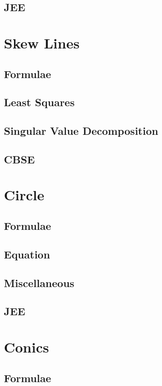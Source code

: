 \documentclass[journal]{IEEEtran}
\begin{document}
	\subsection{JEE}
	
	\newpage
	\section{Skew Lines}
	\subsection{Formulae}
	
	\subsection{Least Squares}
	
	\subsection{Singular Value Decomposition}
	
	\subsection{CBSE}
	
	\newpage
	\section{Circle}
	\subsection{Formulae}
	
	\subsection{Equation}
	
	\subsection{Miscellaneous}
	
	\subsection{JEE}
	
	\newpage
	\section{Conics}
	\subsection{Formulae}
	
\end{document}
